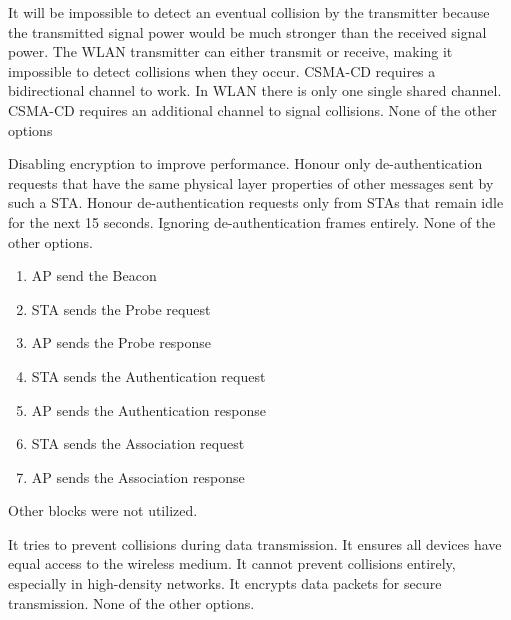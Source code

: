 \begin{checkboxes}
    \CorrectChoice It will be impossible to detect an eventual collision by the transmitter because the transmitted signal power would be much stronger than the received signal power.
    \CorrectChoice The WLAN transmitter can either transmit or receive, making it impossible to detect collisions when they occur.
    \choice CSMA-CD requires a bidirectional channel to work. In WLAN there is only one single shared channel.
    \choice CSMA-CD requires an additional channel to signal collisions.
    \choice None of the other options
\end{checkboxes}

\begin{checkboxes}
    \choice Disabling encryption to improve performance.
    \CorrectChoice Honour only de-authentication requests that have the same physical layer properties of other messages sent by such a STA.
    \CorrectChoice Honour de-authentication requests only from STAs that remain idle for the next 15 seconds.
    \CorrectChoice Ignoring de-authentication frames entirely.
    \choice None of the other options.
\end{checkboxes}

\begin{solution}
    \begin{enumerate}
        \item AP send the Beacon
        \item STA sends the Probe request
        \item AP sends the Probe response
        \item STA sends the Authentication request
        \item AP sends the Authentication response
        \item STA sends the Association request
        \item AP sends the Association response
    \end{enumerate}
    Other blocks were not utilized.
\end{solution}

\begin{checkboxes}
    \CorrectChoice It tries to prevent collisions during data transmission.
    \CorrectChoice It ensures all devices have equal access to the wireless medium.
    \CorrectChoice It cannot prevent collisions entirely, especially in high-density networks.
    \choice It encrypts data packets for secure transmission.
    \choice None of the other options.
\end{checkboxes}


